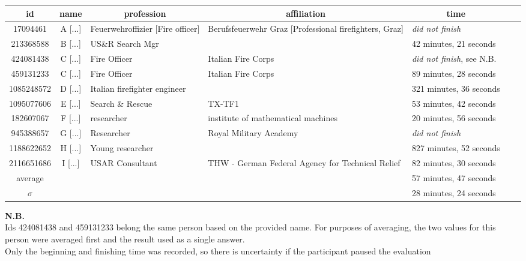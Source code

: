 \documentclass[8pt]{article}
\begin{document}
\begin{longtable}{|c|c|l|p{8cm}|l|l|l|} 
\hline
\multicolumn{1}{|c|}{\textbf{id}} &
\multicolumn{1}{|c|}{\textbf{name}} &
\multicolumn{1}{|c|}{\textbf{profession}} &
\multicolumn{1}{|c|}{\textbf{affiliation}} &
\multicolumn{1}{|c|}{\textbf{time}} \\
\hline \hline 
\endfirsthead 
17094461 & A [...] & Feuerwehroffizier [Fire officer] & Berufsfeuerwehr Graz [Professional firefighters, Graz] & \textit{did not finish} \\ \hline 
213368588 & B [...] & US\&R Search Mgr &  & 42 minutes, 21 seconds \\ \hline 
424081438 & C [...] & Fire Officer & Italian Fire Corps & \textit{did not finish}, see N.B. \\ \hline 
459131233 & C [...] & Fire Officer & Italian Fire Corps & 89 minutes, 28 seconds \\ \hline 
1085248572 & D [...] & Italian firefighter engineer &  & 321 minutes, 36 seconds \\ \hline 
1095077606 & E [...] & Search \& Rescue & TX-TF1 & 53 minutes, 42 seconds \\ \hline 
182607067 & F [...] & researcher & institute of mathematical machines & 20 minutes, 56 seconds \\ \hline 
945388657 & G [...] & Researcher & Royal Military Academy & \textit{did not finish} \\ \hline 
1188622652 & H [...] & Young researcher &  & 827 minutes, 52 seconds \\ \hline 
2116651686 & I [...]  & USAR Consultant & THW - German Federal Agency for Technical Relief & 82 minutes, 30 seconds \\ \hline \hline
average & & & & 57 minutes, 47 seconds \\ \hline
$\sigma$ & & & & 28 minutes, 24 seconds \\ \hline
\end{longtable}
 
\noindent \textbf{N.B.} \\
Ids 424081438 and 459131233 belong the same person based on the provided name. For purposes of averaging, the two values for this person were averaged first and the result used as a single answer. \\
Only the beginning and finishing time was recorded, so there is uncertainty if the participant paused the evaluation

\newpage

%
%
%
%
\end{document}
